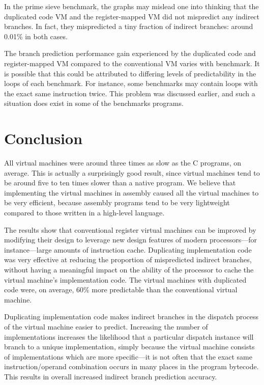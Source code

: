 		In the prime sieve benchmark, the graphs may mislead one into thinking that the duplicated code VM and the register-mapped VM did not mispredict any indirect branches. In fact, they mispredicted a tiny fraction of indirect branches: around 0.01\% in both cases.
		
		The branch prediction performance gain experienced by the duplicated code and register-mapped VM compared to the conventional VM varies with benchmark. It is possible that this could be attributed to differing levels of predictability in the loops of each benchmark. For instance, some benchmarks may contain loops with the exact same instruction twice. This problem was discussed earlier, and such a situation does exist in some of the benchmarks programs.
		
\chapter{Conclusion}
	All virtual machines were around three times as slow as the C programs, on average. This is actually a surprisingly good result, since virtual machines tend to be around five to ten times slower than a native program. We believe that implementing the virtual machines in assembly caused all the virtual machines to be very efficient, because assembly programs tend to be very lightweight compared to those written in a high-level language.
	
	The results show that conventional register virtual machines can be improved by modifying their design to leverage new design features of modern processors---for instance---large amounts of instruction cache. Duplicating implementation code was very effective at reducing the proportion of mispredicted indirect branches, without having a meaningful impact on the ability of the processor to cache the virtual machine's implementation code. The virtual machines with duplicated code were, on average, 60\% more predictable than the conventional virtual machine.
	
	Duplicating implementation code makes indirect branches in the dispatch process of the virtual machine easier to predict. Increasing the number of implementations increases the likelihood that a particular dispatch instance will branch to a unique implementation, simply because the virtual machine consists of implementations which are more specific---it is not often that the exact same instruction/operand combination occurs in many places in the program bytecode. This results in overall increased indirect branch prediction accuracy. 
	

